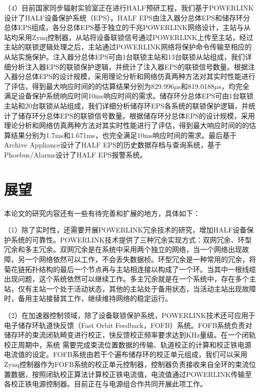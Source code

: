 （4）目前国家同步辐射实验室正在进行HALF预研工程，我们基于POWERLINK设计了HALF设备保护系统（EPS）。HALF EPS由注入器分总体EPS和储存环分总体EPS组成，各分总体EPS基于独立的千兆POWERLINK网络设计，主站与从站均采用Zynq控制器，从站将设备联锁信号通过POWERLINK上传至主站，经过主站的联锁逻辑处理之后，主站通过POWERLINK网络将保护命令传输至相应的从站实施保护。注入器分总体EPS可由1台联锁主站和13台联锁从站组成，我们详细分析注入器EPS的联锁保护逻辑，并统计了注入器EPS的联锁信号数量。根据注入器分总体EPS的设计规模，采用理论分析和网络仿真两种方法对其实时性能进行了评估，得到最大响应时间的的估算结果分别为829.996$\mu$s和819.0188$\mu$s，均完全满足设备保护系统响应时间10ms响应时间的需求。储存环分总体EPS可由1台联锁主站和20台联锁从站组成，我们详细分析储存环EPS各系统的联锁保护逻辑，并统计了储存环分总体EPS的联锁信号数量。根据储存环分总体EPS的设计规模，采用理论分析和网络仿真两种方法对其实时性能进行了评估，得到最大响应时间的的估算结果分别为1.7ms和1.671ms，也完全满足10ms响应时间的需求。最后基于Archive Appliance设计了HALF EPS的历史数据存档与查询系统，基于Phoebus/Alarms设计了HALF EPS报警系统。



\section{展望}

本论文的研究内容还有一些有待完善和扩展的地方，具体如下：

（1）除了实时性，还需要开展POWERLINK冗余技术的研究，增加HALF设备保护系统的可靠性。POWERLINK技术提供了三种冗余实现方式：双网冗余、环型冗余和多主冗余。双网冗余是在系统中采用两个独立的网络，当一个网络出现故障，另一个网络依然可以工作，不会丢失数据桢。环型冗余是一种常用的冗余，将菊花链拓扑结构的最后一个节点再与主站相连接以构成了一个环。当其中一根线缆出现问题，这个系统依然可以继续工作。多主冗余就是在一个系统中，存在多个主站，仅有主站一个处于活动状态，其他的主站处于备用状态，当活动主站出现故障时，备用主站接替其工作，继续维持网络的稳定运行。

（2）在加速器控制领域，除了设备联锁保护系统，POWERLINK技术还可应用于电子储存环轨道快反馈（Fast Orbit Feedback，FOFB）系统。FOFB系统负责对储存环的束流闭轨畸变进行校正，快反馈校正频率要求达到KHz量级。在一个闭轨校正周期中，系统
需要完成束流位置数据的传输、轨道校正的计算和校正铁电源电流值的设定。FOFB系统由若干个遍布储存环的校正单元组成，我们可以采用Zynq控制器作为FOFB系统的校正单元控制器，控制器负责接收来自全环的束流位置数据，按照闭轨校正算法计算校正铁电流值，电流值通过POWERLINK传输至各校正铁电源控制器\cite{Tian-2015}。目前正在与电源组合作共同开展此项工作\cite{Shao2019}。

